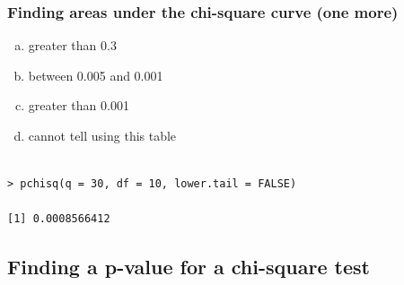 \begin{frame}[fragile]
\frametitle{Finding areas under the chi-square curve (one more)}


{
{\small
\begin{enumerate}[(a)]
\setlength{\itemsep}{0in}
\item greater than 0.3
\item between 0.005 and 0.001
\item greater than 0.001
\item cannot tell using this table
\end{enumerate}
}
}

\pause

\begin{verbatim}

> pchisq(q = 30, df = 10, lower.tail = FALSE)

[1] 0.0008566412

\end{verbatim}

\end{frame}


\subsection{Finding a p-value for a chi-square test}



